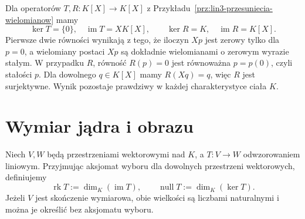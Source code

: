 \begin{przyklad}
\label{prz:lin3-jadro-przesuniecia}
Dla operatorów \(T,R\colon K[X]\to K[X]\)
z Przykładu~\ref{prz:lin3-przesuniecia-wielomianow}
mamy
\[
 \ker T=\{0\},\quad
 \operatorname{im}T=XK[X],\qquad
 \ker R=K,\quad
 \operatorname{im}R=K[X].
\]
Pierwsze dwie równości wynikają z tego,
że iloczyn \(Xp\) jest zerowy tylko dla \(p=0\),
a wielomiany postaci \(Xp\) są dokładnie
wielomianami o zerowym wyrazie stałym.
W przypadku \(R\), równość \(R(p)=0\)
jest równoważna \(p=p(0)\), czyli stałości \(p\).
Dla dowolnego \(q\in K[X]\) mamy
\(R(Xq)=q\), więc \(R\) jest surjektywne.
Wynik pozostaje prawdziwy w każdej
charakterystyce ciała \(K\).
\end{przyklad}

\section{Wymiar jądra i obrazu}
\label{sec:lin3-twierdzenie-rzad}

\begin{definicja}
\label{def:lin3-rzad-nullity}
Niech \(V,W\) będą przestrzeniami wektorowymi
nad \(K\), a \(T\colon V\to W\) odwzorowaniem
liniowym. Przyjmując aksjomat wyboru dla dowolnych
przestrzeni wektorowych, definiujemy
\[
 \operatorname{rk}T:=\dim_K(\operatorname{im}T),
 \qquad
 \operatorname{null}T:=\dim_K(\ker T).
\]
Jeżeli \(V\) jest skończenie wymiarowa,
obie wielkości są liczbami naturalnymi
i można je określić bez aksjomatu wyboru.
\end{definicja}

